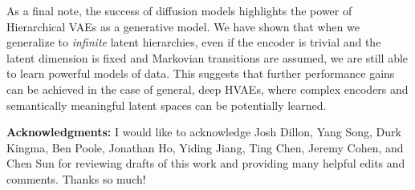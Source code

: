 As a final note, the success of diffusion models highlights the power of Hierarchical VAEs as a generative model.  We have shown that when we generalize to \textit{infinite} latent hierarchies, even if the encoder is trivial and the latent dimension is fixed and Markovian transitions are assumed, we are still able to learn powerful models of data.  This suggests that further performance gains can be achieved in the case of general, deep HVAEs, where complex encoders and semantically meaningful latent spaces can be potentially learned.

\textbf{Acknowledgments:} I would like to acknowledge Josh Dillon, Yang Song, Durk Kingma, Ben Poole, Jonathan Ho, Yiding Jiang, Ting Chen, Jeremy Cohen, and Chen Sun for reviewing drafts of this work and providing many helpful edits and comments.  Thanks so much!

